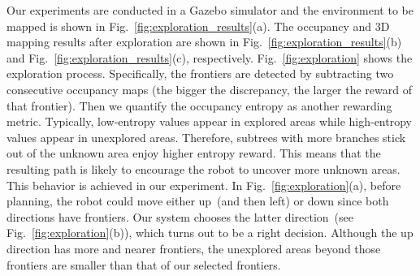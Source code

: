 Our experiments are conducted in a Gazebo simulator and the environment to be mapped is shown in Fig.~\ref{fig:exploration_results}(a). The occupancy and 3D mapping results after exploration are shown in Fig.~\ref{fig:exploration_results}(b) and Fig.~\ref{fig:exploration_results}(c), respectively.
Fig.~\ref{fig:exploration} shows the exploration process. %
Specifically, the frontiers are detected by subtracting two consecutive occupancy maps (the bigger the discrepancy, the larger the reward of that frontier). Then we quantify the occupancy entropy as another rewarding metric. %
Typically, low-entropy values appear in explored areas while high-entropy values appear in unexplored areas. %
Therefore, subtrees with more branches stick out of the unknown area enjoy higher entropy reward.
This means that the resulting path is likely to encourage the robot to uncover more unknown areas.
This behavior is achieved in our experiment.
In Fig.~\ref{fig:exploration}(a), before planning, the robot could move either up~(and then left) or down since both directions have frontiers.
Our system chooses the latter direction~(see Fig.~\ref{fig:exploration}(b)), which turns out to be a right decision. Although the up direction has more and nearer frontiers, the unexplored areas beyond those frontiers are smaller than that of our selected frontiers.



